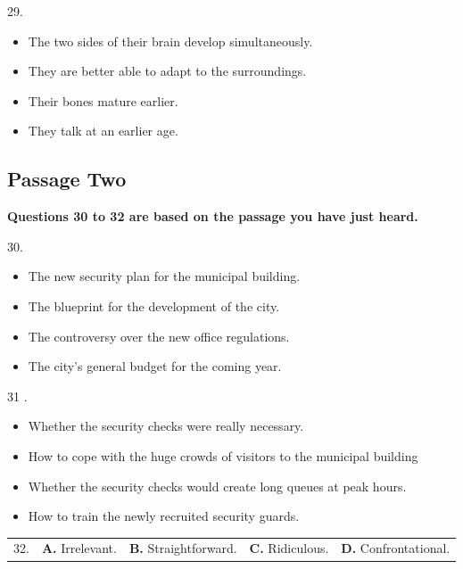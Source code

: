 \documentclass[UTF8,11pt]{ctexart}
\begin{document}
29.


\begin{itemize}[leftmargin=2em,itemsep=.2em,topsep=.4em]\item[A.] The two sides of their brain develop simultaneously.
\item[B.] They are better able to adapt to the surroundings.
\item[C.] Their bones mature earlier.
\item[D.] They talk at an earlier age.
\end{itemize}

\subsection*{\textbf{Passage Two}}


\textbf{Questions 30 to 32 are based on the passage you have just heard.}


30.


\begin{itemize}[leftmargin=2em,itemsep=.2em,topsep=.4em]\item[A.] The new security plan for the municipal building.
\item[B.] The blueprint for the development of the city.
\item[C.] The controversy over the new office regulations.
\item[D.] The city's general budget for the coming year.
\end{itemize}

31 .


\begin{itemize}[leftmargin=2em,itemsep=.2em,topsep=.4em]\item[A.] Whether the security checks were really necessary.
\item[B.] How to cope with the huge crowds of visitors to the municipal building
\item[C.] Whether the security checks would create long queues at peak hours.
\item[D.] How to train the newly recruited security guards.
\end{itemize}

\noindent\begin{tabularx}{\linewidth}{@{}lXXXX@{}}32. & \textbf{A.} Irrelevant. & \textbf{B.} Straightforward. & \textbf{C.} Ridiculous. & \textbf{D.} Confrontational.\\\end{tabularx}\par
\end{document}
